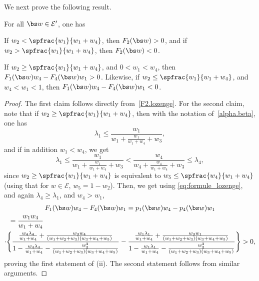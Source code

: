 We next prove the following result.
\begin{lemma}\label{sign.F}
For all $\bs w\in \mathcal E'$, one has
\begin{enumeratei}
\item\label{sign.Fi}
If $w_2 < \spfrac{w_1}{w_1+w_4}$, then $F_2(\bs w) > 0$, and if $w_2 > \spfrac{w_1}{w_1+w_4}$, then $F_2(\bs w) < 0$.
\item\label{sign.Fii}
If $w_2\ge \spfrac{w_1}{w_1+w_4}$, and $0<w_1<w_4$, then $F_1(\bs w)w_4 - F_4(\bs w)w_1 >0$. Likewise, if $w_2\le \spfrac{w_1}{w_1+w_4}$, and $w_4<w_1<1$, then $F_1(\bs w)w_4 - F_4(\bs w)w_1 <0$.
\end{enumeratei}
\end{lemma}
\begin{proof}
The first claim follows directly from~\eqref{F2.lozenge}. For the second claim, note that if $w_2\ge \spfrac{w_1}{w_1+w_4}$, then with the notation of~\eqref{alpha.beta}, one has
\[
{\lambda_{1}} \le \frac{w_1}{w_1+\frac{w_1}{w_1+w_4} + w_3}, 
\]
and if in addition $w_1<w_4$, we get
\[
{\lambda_{1}}\le \frac{w_1}{w_1+\frac{w_1}{w_1+w_4} + w_3}< \frac{w_4}{w_4+\frac{w_4}{w_1+w_4} + w_3} \le {\lambda_{4}},
\]
since $w_2 \ge \spfrac{w_1}{w_1+w_4}$ is equivalent to $w_5 \le \spfrac{w_4}{w_1+w_4}$ (using that for $w\in \mathcal E$, $w_5 = 1-w_2$).
Then, we get using \eqref{eq:formule_lozenge}, and again ${\lambda_{4}} \ge {\lambda_{1}}$, and $w_4>w_1$,
\begin{multline*}
F_1(\bs w)w_4 - F_4(\bs w)w_1
= p_1(\bs w)w_4 - p_4(\bs w)w_1 \\
\shoveleft{= \frac{w_1w_4}{w_1+w_4}}\\
\cdot \Biggl\{
\frac{ \frac{w_4{\lambda_{4}}}{w_1+w_4}+\frac{w_3w_4}{(w_1+w_2+w_3)(w_3+w_4+w_5)}}
{1- \frac{w_4{\lambda_{4}}}{w_1+w_4}-\frac{w_3^2}{(w_1+w_2+w_3)(w_3+w_4+w_5)}} - \frac{ \frac{w_1{\lambda_{1}} }{w_1+w_4}+\frac{w_3w_1}{(w_1+w_2+w_3)(w_3+w_4+w_5)}}
{1- \frac{w_1{\lambda_{1}}}{w_1+w_4}-\frac{w_3^2}{(w_1+w_2+w_3)(w_3+w_4+w_5)}} \Biggr\}
> 0,
\end{multline*}
proving the first statement of (ii). The second statement follows from similar arguments.
\end{proof}

